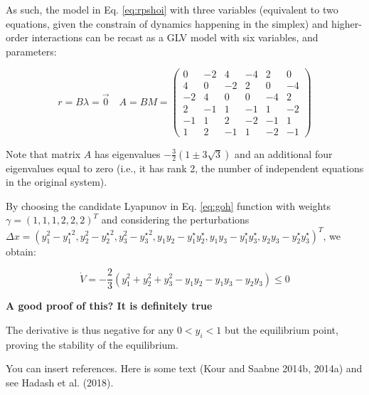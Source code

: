 \documentclass{article}
\begin{document}
As such, the model in Eq. \ref{eq:rpshoi} with three variables
(equivalent to two equations, given the constrain of dynamics happening
in the simplex) and higher-order interactions can be recast as a GLV
model with six variables, and parameters:

\begin{equation}
r = B \lambda = \vec{0}
\quad
A = B M = \begin{pmatrix}
0 & -2 & 4 & -4 & 2 & 0 \\ 
4 & 0 & -2 & 2 & 0 & -4 \\ 
-2 & 4 & 0 & 0 & -4 & 2 \\ 
2 & -1 & 1 & -1 & 1 & -2 \\ 
-1 & 1 & 2 & -2 & -1 & 1 \\ 
1 & 2 & -1 & 1 & -2 & -1
\end{pmatrix}
\end{equation}

Note that matrix \(A\) has eigenvalues
\(-\frac{3}{2}(1 \pm 3 \sqrt{3})\) and an additional four eigenvalues
equal to zero (i.e., it has rank 2, the number of independent equations
in the original system).

By choosing the candidate Lyapunov in Eq. \ref{eq:goh} function with
weights \(\gamma = (1,1,1, 2,2,2)^T\) and considering the perturbations
\(\Delta x = (y_1^2 - {y_1^\star}^2, y_2^2 - {y_2^\star}^2, y_3^2 - {y_3^\star}^2, y_1 y_2 - y_1^\star y_2^\star, y_1 y_3 - y_1^\star y_3^\star, y_2 y_3 - y_2^\star y_3^\star)^T\),
we obtain:

\begin{equation}
\dot{V} = -\frac{2}{3} \left(y_1^2 + y_2^2 + y_3^2 - y_1 y_2 -y_1 y_3 - y_2 y_3 \right) \leq 0
\end{equation}

\textbf{A good proof of this? It is definitely true}

The derivative is thus negative for any \(0<y_i<1\) but the equilibrium
point, proving the stability of the equilibrium.

You can insert references. Here is some text (Kour and Saabne 2014b,
2014a) and see Hadash et al. (2018).
\end{document}
